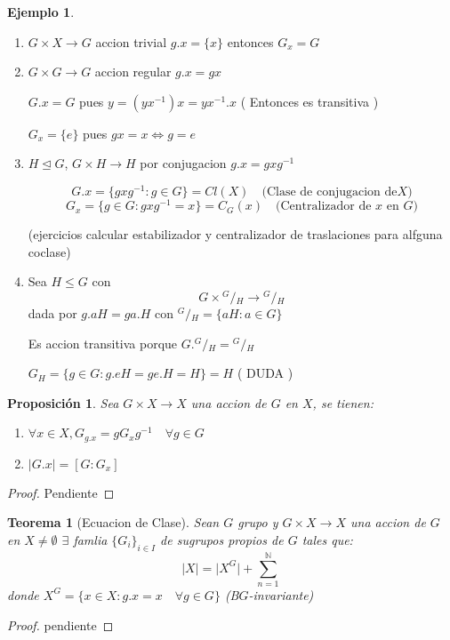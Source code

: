 \documentclass[10pt]{extarticle}
\theoremstyle{break}
\newtheorem{theorem}{Teorema}[section]
\newtheorem{proposition}{Proposición}
\theoremstyle{definition}
\newtheorem{example}{Ejemplo}[section]
\newcommand\quotient[2]{{^{\displaystyle #1}}/{_{\displaystyle #2}}}
\begin{document}
\begin{example}
	\begin{enumerate}
		\item $G\times X\longrightarrow G$ accion trivial $g.x=\{x\}$ entonces $G_{x}=G$
		\item $G\times G \longrightarrow G$ accion regular $g.x=gx$
			
			$G.x=G$ pues $y=(yx^{-1} )x=yx^{-1}.x$ ( Entonces es transitiva )

			$G_{x}=\{e\}$ pues $gx=x\iff g=e$
		\item $H\trianglelefteq G$, $G\times H \longrightarrow H$ por conjugacion $g.x=gxg^{-1} $

			$$G.x=\{gxg^{-1} : g\in G \}=Cl(X) \quad \text{(Clase de conjugacion de} X)$$ 
			$$G_{x}=\{g\in G: gxg^{-1} =x\}=C_{G}(x)\quad \text{(Centralizador de } x \text{ en } G)$$

			(ejercicios calcular estabilizador y centralizador de traslaciones para alfguna coclase)
		\item Sea $H\leq G$ con 
			$$G\times \quotient{G}{H}\longrightarrow \quotient{G}{H}$$ 
			dada por $g.aH=ga.H$ con $\quotient{G}{H}=\{aH: a\in G \}$

			Es accion transitiva porque $G.\quotient{G}{H}=\quotient{G}{H}$

			$G_{H}=\{g\in G : g.eH=ge.H=H\}=H$ ( DUDA )
	\end{enumerate}
\end{example}

\begin{proposition}
	Sea $G\times X\longrightarrow X$ una accion de $G$ en $X$, se tienen:
	\begin{enumerate} 
		\item $\forall x\in X,G_{g.x}=gG_{x}g^{-1} \quad\forall g\in G$
		\item $ \lvert G.x\rvert =[G:G_{x}] $ 
	\end{enumerate}
\end{proposition}

\begin{proof}
	Pendiente
\end{proof}

\begin{theorem}[Ecuacion de Clase]
	Sean $G$ grupo y $ G\times X\longrightarrow X $ una accion de $G$ en $ X\neq \emptyset$ $ \exists  $ famlia $ \{G_{i}\}_{i\in I } $ de sugrupos propios de $G$ tales que:
	$$\lvert X \rvert =\lvert X^{G} \rvert + \sum_{n=1}^{\mathbb{N}} $$
	donde $ X^{G} = \{x\in X: g.x=x\quad\forall g\in G \} $ (B$ G $-invariante)
\end{theorem}
\begin{proof}
	pendiente	
\end{proof}
\end{document}
